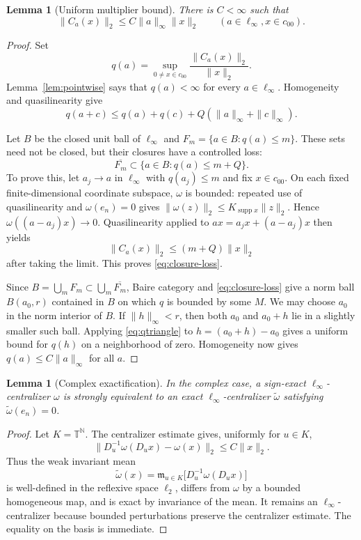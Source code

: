 \documentclass[11pt]{article}
\newtheorem{lemma}[theorem]{Lemma}
\newcommand{\czz}{c_{00}}
\newcommand{\TT}{\mathbb T}
\newcommand{\supp}{\operatorname{supp}}
\newcommand{\Dop}[1]{D_{#1}}
\begin{document}
\begin{lemma}[Uniform multiplier bound]\label{lem:uniform-multiplier}
There is $C<\infty$ such that
\[
 \|C_a(x)\|_2\le C\|a\|_\infty\|x\|_2
 \qquad(a\in\ell_\infty,x\in\czz).
\]
\end{lemma}

\begin{proof}
Set
\[
 q(a)=\sup_{0\ne x\in\czz}\frac{\|C_a(x)\|_2}{\|x\|_2}.
\]
Lemma~\ref{lem:pointwise} says that $q(a)<\infty$ for every
$a\in\ell_\infty$.  Homogeneity and quasilinearity give
\begin{equation}\label{eq:qtriangle}
 q(a+c)\le q(a)+q(c)+Q(\|a\|_\infty+\|c\|_\infty).
\end{equation}

Let $B$ be the closed unit ball of $\ell_\infty$ and
$F_m=\{a\in B:q(a)\le m\}$.  These sets need not be closed, but their
closures have a controlled loss:
\begin{equation}\label{eq:closure-loss}
 \overline{F_m}\subset\{a\in B:q(a)\le m+Q\}.
\end{equation}
To prove this, let $a_j\to a$ in $\ell_\infty$ with $q(a_j)\le m$ and fix
$x\in\czz$.  On each fixed finite-dimensional coordinate subspace,
$\omega$ is bounded: repeated use of quasilinearity and $\omega(e_n)=0$
gives $\|\omega(z)\|_2\le K_{\supp x}\|z\|_2$.  Hence
$\omega((a-a_j)x)\to0$.  Quasilinearity applied to
$ax=a_jx+(a-a_j)x$ then yields
\[
 \|C_a(x)\|_2\le(m+Q)\|x\|_2
\]
after taking the limit.  This proves \eqref{eq:closure-loss}.

Since $B=\bigcup_mF_m\subset\bigcup_m\overline{F_m}$, Baire category and
\eqref{eq:closure-loss} give a norm ball $B(a_0,r)$ contained in $B$ on
which $q$ is bounded by some $M$.  We may choose $a_0$ in the norm interior
of $B$.  If $\|h\|_\infty<r$, then both $a_0$ and $a_0+h$ lie in a slightly
smaller such ball.  Applying \eqref{eq:qtriangle} to
$h=(a_0+h)-a_0$ gives a uniform bound for $q(h)$ on a neighborhood of zero.
Homogeneity now gives $q(a)\le C\|a\|_\infty$ for all $a$.
\end{proof}

\begin{lemma}[Complex exactification]\label{lem:full-exact}
In the complex case, a sign-exact $\ell_\infty$-centralizer $\omega$ is
strongly equivalent to an exact $\ell_\infty$-centralizer
$\widetilde\omega$ satisfying $\widetilde\omega(e_n)=0$.
\end{lemma}

\begin{proof}
Let $K=\TT^{\mathbb N}$.  The centralizer estimate gives, uniformly for
$u\in K$,
\[
 \|\Dop u^{-1}\omega(\Dop u x)-\omega(x)\|_2
 \le C\|x\|_2.
\]
Thus the weak invariant mean
\[
 \widetilde\omega(x)
 =\mathfrak m_{u\in K}\big[\Dop u^{-1}\omega(\Dop u x)\big]
\]
is well-defined in the reflexive space $\ell_2$, differs from $\omega$ by a
bounded homogeneous map, and is exact by invariance of the mean.  It remains
an $\ell_\infty$-centralizer because bounded perturbations preserve the
centralizer estimate.  The equality on the basis is immediate.
\end{proof}
\end{document}

